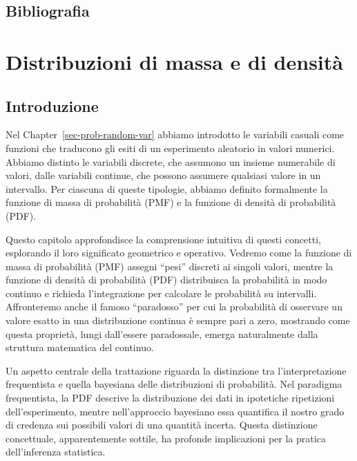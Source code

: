 \documentclass[
  letterpaper,
  DIV=11,
  numbers=noendperiod,
  oneside]{scrreprt}
\theoremstyle{definition}
\theoremstyle{plain}
\theoremstyle{definition}
\theoremstyle{remark}
\begin{document}
\section*{Bibliografia}\label{bibliografia-3}


\chapter{Distribuzioni di massa e di densità}\label{sec-prob-distr}

\section*{Introduzione}\label{introduzione-7}


Nel Chapter~\ref{sec-prob-random-var} abbiamo introdotto le variabili
casuali come funzioni che traducono gli esiti di un esperimento
aleatorio in valori numerici. Abbiamo distinto le variabili discrete,
che assumono un insieme numerabile di valori, dalle variabili continue,
che possono assumere qualsiasi valore in un intervallo. Per ciascuna di
queste tipologie, abbiamo definito formalmente la funzione di massa di
probabilità (PMF) e la funzione di densità di probabilità (PDF).

Questo capitolo approfondisce la comprensione intuitiva di questi
concetti, esplorando il loro significato geometrico e operativo. Vedremo
come la funzione di massa di probabilità (PMF) assegni ``pesi'' discreti
ai singoli valori, mentre la funzione di densità di probabilità (PDF)
distribuisca la probabilità in modo continuo e richieda l'integrazione
per calcolare le probabilità su intervalli. Affronteremo anche il famoso
``paradosso'' per cui la probabilità di osservare un valore esatto in
una distribuzione continua è sempre pari a zero, mostrando come questa
proprietà, lungi dall'essere paradossale, emerga naturalmente dalla
struttura matematica del continuo.

Un aspetto centrale della trattazione riguarda la distinzione tra
l'interpretazione frequentista e quella bayesiana delle distribuzioni di
probabilità. Nel paradigma frequentista, la PDF descrive la
distribuzione dei dati in ipotetiche ripetizioni dell'esperimento,
mentre nell'approccio bayesiano essa quantifica il nostro grado di
credenza sui possibili valori di una quantità incerta. Questa
distinzione concettuale, apparentemente sottile, ha profonde
implicazioni per la pratica dell'inferenza statistica.
\end{document}
